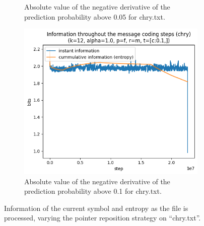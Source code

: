 \documentclass{article}
\begin{document}
\begin{figure}
\begin{subfigure}[b]{0.3\textwidth}
\begin{center}
        \end{center}
        \caption{Absolute value of the negative derivative of the prediction probability above 0.05 for chry.txt.}
        \label{fig:results-threshold-c-0.05}
    \end{subfigure}
    \hfill
    \begin{subfigure}[b]{0.3\textwidth}
        \begin{center}
            \includegraphics[width=1.0\linewidth]{../scripts/images/chry_12_1.0_f_m_[c:0.1,].png}
        \end{center}
        \caption{Absolute value of the negative derivative of the prediction probability above 0.1 for chry.txt.}
        \label{fig:results-threshold-c-0.1}
    \end{subfigure}
    \caption{Information of the current symbol and entropy as the file is processed, varying the pointer reposition strategy on ``chry.txt''.}
    \label{fig:results-threshold}
\end{figure}
\end{document}
